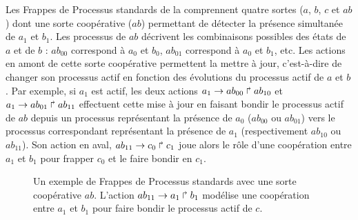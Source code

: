 \begin{example}
  Les Frappes de Processus standards de la 
  comprennent quatre sortes ($a$, $b$, $c$ et $ab$) dont une sorte coopérative ($ab$)
  permettant de détecter la présence simultanée de $a_1$ et $b_1$.
  Les processus de $ab$ décrivent les combinaisons possibles des états de $a$ et de $b$ :
  $ab_{00}$ correspond à $a_0$ et $b_0$, $ab_{01}$ correspond à $a_0$ et $b_1$, etc.
  Les actions en amont de cette sorte coopérative permettent la mettre à jour,
  c'est-à-dire de changer son processus actif en fonction des évolutions
  du processus actif de $a$ et $b$.
  Par exemple, si $a_1$ est actif, les deux actions
  $a_1\rightarrow ab_{00}\Rsh ab_{10}$ et $a_1\rightarrow ab_{01}\Rsh ab_{11}$
  effectuent cette mise à jour en faisant bondir le processus actif de $ab$ depuis
  un processus représentant la présence de $a_0$ ($ab_{00}$ ou $ab_{01}$)
  vers le processus correspondant représentant la présence de $a_1$
  (respectivement $ab_{10}$ ou $ab_{11}$).
  Son action en aval, $ab_{11}\rightarrow c_0\Rsh c_1$
  joue alors le rôle d'une coopération entre $a_1$ et $b_1$
  pour frapper $c_0$ et le faire bondir en $c_1$.
  
  \begin{figure}[tb]
  \begin{center}\end{center}
  \caption{%
    Un exemple de Frappes de Processus standards
    avec une sorte coopérative $ab$.
    L'action $ab_{11}\rightarrow a_1\Rsh b_1$ modélise
    une coopération entre $a_1$ et $b_1$ pour faire bondir le processus actif de $c$.}
  \end{figure}
\end{example}


